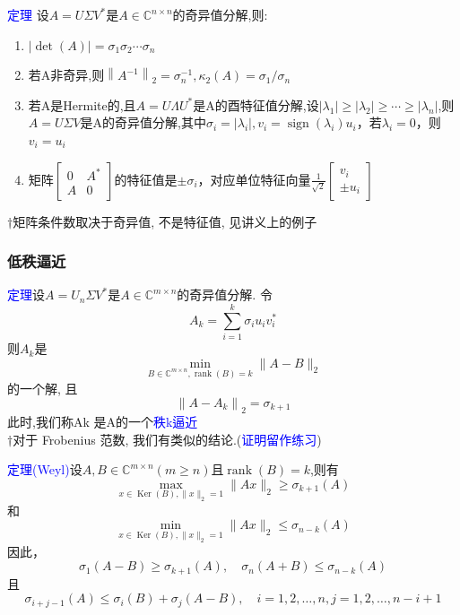 \documentclass[notheorems,serif]{beamer}
\begin{document}
\begin{frame}
\textcolor{blue}{定理} 设$A=U \Sigma V^{*}$是$A \in \mathbb{C}^{n \times n}$的奇异值分解,则:
\begin{enumerate}[(1)]
	\item $|\operatorname{det}(A)|=\sigma_{1} \sigma_{2} \cdots \sigma_{n}$
	\item 若A非奇异,则$\left\|A^{-1}\right\|_{2}=\sigma_{n}^{-1}, \kappa_{2}(A)=\sigma_{1} / \sigma_{n}$
	\item 若A是Hermite的,且$A=U \Lambda U^{*}$是A的酉特征值分解,设$\left|\lambda_{1}\right| \geq\left|\lambda_{2}\right| \geq \cdots \geq\left|\lambda_{n}\right|$,则$A=U \Sigma V$是A的奇异值分解,其中$\sigma_{i}=\left|\lambda_{i}\right|, v_{i}=\operatorname{sign}\left(\lambda_{i}\right) u_{i}$，若$\lambda_{i}=0$，则$v_{i}=u_{i}$
	\item 矩阵$\left[\begin{array}{cc}{0} & {A^{*}} \\ {A} & {0}\end{array}\right]$的特征值是$\pm \sigma_{i}$，对应单位特征向量$\frac{1}{\sqrt{2}}\left[\begin{array}{c}{v_{i}} \\ { \pm u_{i}}\end{array}\right]$
\end{enumerate}
$\dagger$矩阵条件数取决于奇异值, 不是特征值, 见讲义上的例子
\end{frame}

\begin{frame}
\frametitle{低秩逼近}

\textcolor{blue}{定理}设$A=U_{n} \Sigma V^{*}$是$A \in \mathbb{C}^{m \times n}$的奇异值分解. 令
$$
A_{k}=\sum_{i=1}^{k} \sigma_{i} u_{i} v_{i}^{*}
$$
则$A_{k}$是
\begin{equation}
\min _{B \in \mathbb{C}^{m \times n}, \operatorname{rank}(B)=k}\|A-B\|_{2}
\end{equation}
的一个解, 且
$$
\left\|A-A_{k}\right\|_{2}=\sigma_{k+1}
$$
此时,我们称Ak 是A的一个\textcolor{blue}{秩k逼近}\\
$\dagger$对于 Frobenius 范数, 我们有类似的结论.(\textcolor{blue}{证明留作练习})
\end{frame}

\begin{frame}
\textcolor{blue}{定理(Weyl)}设$A, B \in \mathbb{C}^{m \times n}(m \geq n)$且$\operatorname{rank}(B)=k$,则有
\begin{equation}
\max _{x \in \operatorname{Ker}(B),\|x\|_{2}=1}\|A x\|_{2} \geq \sigma_{k+1}(A)
\end{equation}
和
\begin{equation}
\min _{x \in \operatorname{Ker}(B),\|x\|_{2}=1}\|A x\|_{2} \leq \sigma_{n-k}(A)
\end{equation}
因此，
\begin{equation}
\sigma_{1}(A-B) \geq \sigma_{k+1}(A), \quad \sigma_{n}(A+B) \leq \sigma_{n-k}(A)
\end{equation}
且
\begin{equation}
\sigma_{i+j-1}(A) \leq \sigma_{i}(B)+\sigma_{j}(A-B), \quad i=1,2, \ldots, n, j=1,2, \ldots, n-i+1
\end{equation}
\end{frame}
\end{document}
